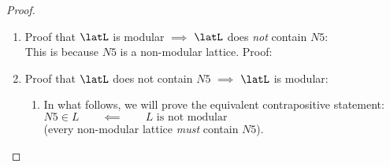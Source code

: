 \begin{proof}
\begin{enumerate}
  \item Proof that $\latL$ is modular $\implies$ $\latL$ does \emph{not} contain $N5$:\\
    This is because $N5$ is a non-modular lattice. Proof: 

  \item Proof that $\latL$ does not contain $N5$ $\implies$ $\latL$ is modular:
    \begin{enumerate}
      \item In what follows, we will prove the equivalent contrapositive statement:\\
            $ N5 \in L \qquad\impliedby\qquad L\text{ is not modular}$\\
            (every non-modular lattice \emph{must} contain $N5$).


\end{enumerate}
\end{enumerate}
\end{proof}
